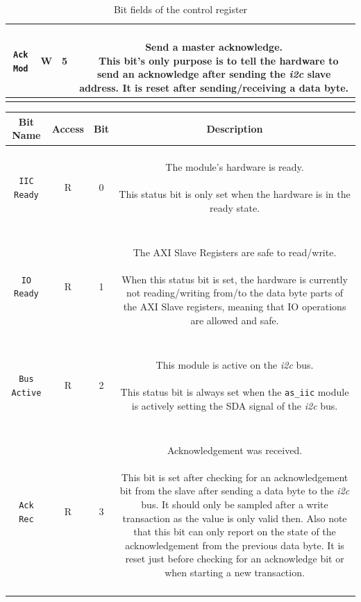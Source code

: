 \begin{longtable}[htb]{|c|c|c|c|}
\hline

\texttt{Ack Mod} & W & 5 &
\parbox{9cm}{ ~ \\ Send a master acknowledge. \\ ~ \small
This bit's only purpose is to tell the hardware to send an acknowledge after sending the \textit{i2c} slave address.
It is reset after sending/receiving a data byte.
\vspace{0.3em} } \\

\hline

\caption{Bit fields of the control register}
\label{07-05-as-iic-control-bits}
\end{longtable}

\begin{longtable}[htb]{|c|c|c|c|}
\hline 
\textbf{Bit Name} & \textbf{Access} & \textbf{Bit} & \textbf{Description} \\
\hline
\endhead


\texttt{IIC Ready} & R & 0 &
\parbox{8,5cm}{ ~ \\ The module's hardware is ready. \\ ~ \\ \small
This status bit is only set when the hardware is in the ready state.
\\ ~ } \\

\hline

\texttt{IO Ready} & R & 1 &
\parbox{8,5cm}{ ~ \\ The AXI Slave Registers are safe to read/write. \\ ~ \\ \small
When this status bit is set, the hardware is currently not reading/writing from/to the data byte parts of the AXI Slave registers, meaning that IO operations are allowed and safe.
\\ ~ } \\

\hline

\texttt{Bus Active} & R & 2 &
\parbox{8,5cm}{ ~ \\ This module is active on the \textit{i2c} bus. \\ ~ \\ \small
This status bit is always set when the \texttt{as\_iic} module is actively setting the SDA signal of the \textit{i2c} bus.
\\ ~ } \\

\hline

\texttt{Ack Rec} & R & 3 &
\parbox{8,5cm}{ ~ \\ Acknowledgement was received. \\ ~ \\ \small
This bit is set after checking for an acknowledgement bit from the slave after sending a data byte to the \textit{i2c} bus.
It should only be sampled after a write transaction as the value is only valid then.
Also note that this bit can only report on the state of the acknowledgement from the previous data byte.
It is reset just before checking for an acknowledge bit or when starting a new transaction.
\\ ~ } \\


\end{longtable}
